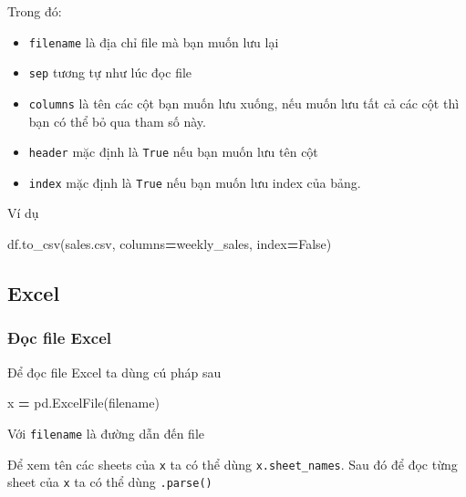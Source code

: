 \documentclass[
]{book}
\newenvironment{Shaded}{\begin{snugshade}}{\end{snugshade}}
\newcommand{\NormalTok}[1]{#1}
\newcommand{\OperatorTok}[1]{\textcolor[rgb]{0.81,0.36,0.00}{\textbf{#1}}}
\newcommand{\StringTok}[1]{\textcolor[rgb]{0.31,0.60,0.02}{#1}}
\newcommand{\VariableTok}[1]{\textcolor[rgb]{0.00,0.00,0.00}{#1}}
\begin{document}
Trong đó:

\begin{itemize}
\item
  \texttt{filename} là địa chỉ file mà bạn muốn lưu lại
\item
  \texttt{sep} tương tự như lúc đọc file
\item
  \texttt{columns} là tên các cột bạn muốn lưu xuống, nếu muốn lưu tất cả các cột thì
  bạn có thể bỏ qua tham số này.
\item
  \texttt{header} mặc định là \texttt{True} nếu bạn muốn lưu tên cột
\item
  \texttt{index} mặc định là \texttt{True} nếu bạn muốn lưu index của bảng.
\end{itemize}

Ví dụ

\begin{Shaded}
\begin{Highlighting}[]
\NormalTok{df.to\_csv(}\StringTok{\textquotesingle{}sales.csv\textquotesingle{}}\NormalTok{, columns}\OperatorTok{=}\StringTok{\textquotesingle{}weekly\_sales\textquotesingle{}}\NormalTok{, index}\OperatorTok{=}\VariableTok{False}\NormalTok{)}
\end{Highlighting}
\end{Shaded}

\hypertarget{excel}{%
\subsection{Excel}\label{excel}}

\hypertarget{ux111ux1ecdc-file-excel}{%
\subsubsection{Đọc file Excel}\label{ux111ux1ecdc-file-excel}}

Để đọc file Excel ta dùng cú pháp sau

\begin{Shaded}
\begin{Highlighting}[]
\NormalTok{x }\OperatorTok{=}\NormalTok{ pd.ExcelFile(filename)}
\end{Highlighting}
\end{Shaded}

Với \texttt{filename} là đường dẫn đến file

Để xem tên các sheets của \texttt{x} ta có thể dùng \texttt{x.sheet\_names}. Sau đó để đọc từng sheet của \texttt{x} ta có thể dùng \texttt{.parse()}
\end{document}
